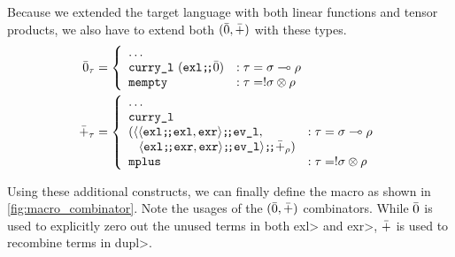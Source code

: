   Because we extended the target language with both linear functions and tensor products, we also have to extend both $(\bar{0}, \bar{+})$ with these types.
  \begin{align*}
    \bar{0}_\tau &=
      \left\{
        \begin{array}{ll}
          \dots \\
          \texttt{curry\_l}\ (\texttt{exl} \texttt{;\!;} \bar{0}) & : \tau = \sigma \multimap \rho \\
          \texttt{mempty} & : \tau = !\sigma\otimes\rho \\
        \end{array}
      \right. \\
    \bar{+}_\tau &=
      \left\{
        \begin{array}{ll}
          \dots \\
          \texttt{curry\_l}\  \\
            (\langle
              \langle \texttt{exl} \texttt{;\!;} \texttt{exl}, \texttt{exr} \rangle \texttt{;\!;} \texttt{ev\_l}, & : \tau = \sigma \multimap \rho \\
              \;\;\;\langle \texttt{exl} \texttt{;\!;} \texttt{exr}, \texttt{exr} \rangle \texttt{;\!;} \texttt{ev\_l} \rangle \texttt{;\!;} \bar{+}_\rho) \\
          \texttt{mplus} & : \tau = !\sigma\otimes\rho \\
        \end{array}
      \right.
  \end{align*}

  Using these additional constructs, we can finally define the macro as shown in \cref{fig:macro_combinator}.
  Note the usages of the $(\bar{0}, \bar{+})$ combinators.
  While $\bar{0}$ is used to explicitly zero out the unused terms in both \<exl> and \<exr>, $\bar{+}$ is used to recombine terms in \<dupl>.


